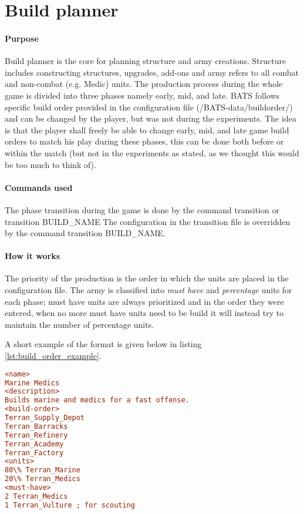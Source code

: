 \section{Build planner}
\paragraph{Purpose}
Build planner is the core for planning structure and army creations. Structure includes constructing structures, upgrades, add-ons and army refers to all combat and non-combat (e.g. Medic) units. The production process during the whole game is divided into three phases namely early, mid, and late. BATS follows specific build order provided in the configuration file (/BATS-data/buildorder/) and can be changed by the player, but was not during the experiments. The idea is that the player shall freely be able to change early, mid, and late game build orders to match his play during these phases, this can be done both before or within the match (but not in the experiments as stated, as we thought this would be too much to think of).

\paragraph{Commands used}
The phase transition during the game is done by the command transition or transition BUILD\_NAME The configuration in the transition file is overridden by the command transition BUILD\_NAME.

\paragraph{How it works}
The priority of the production is the order in which the units are placed in the configuration file. The army is classified into \emph{must have} and \emph{percentage} units for each phase; must have units are always prioritized and in the order they were entered, when no more must have units need to be build it will instead try to maintain the number of percentage units.

A short example of the format is given below in listing \ref{lst:build_order_example}.

\begin{lstlisting}[label={lst:build_order_example},caption={Build order example file},language=ini]
<name>
Marine Medics
<description>
Builds marine and medics for a fast offense.
<build-order>
Terran_Supply_Depot
Terran_Barracks
Terran_Refinery
Terran_Academy
Terran_Factory
<units>
80\% Terran_Marine
20\% Terran_Medics
<must-have>
2 Terran_Medics
1 Terran_Vulture ; for scouting
\end{lstlisting}

